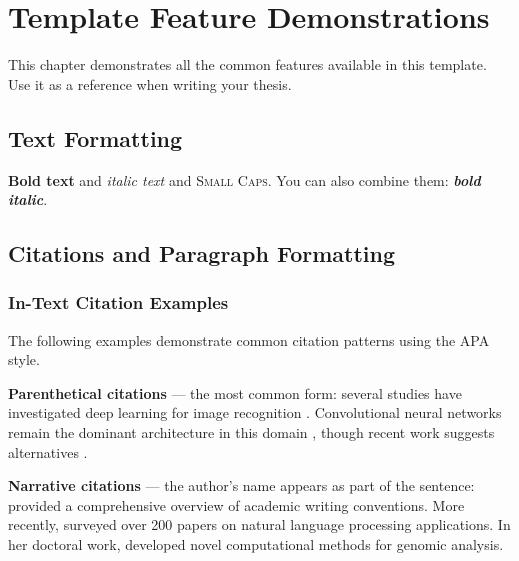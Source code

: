 
\chapter{Template Feature Demonstrations}
\label{chap:examples}

This chapter demonstrates all the common features available in this
template. Use it as a reference when writing your thesis.

\section{Text Formatting}
\label{sec:text}

\textbf{Bold text} and \textit{italic text} and \textsc{Small Caps}.
You can also combine them: \textbf{\textit{bold italic}}.

\section{Citations and Paragraph Formatting}
\label{sec:citations}

\subsection{In-Text Citation Examples}

The following examples demonstrate common citation patterns using the
APA style.

\textbf{Parenthetical citations} — the most common form:
several studies have investigated deep learning for image recognition
\parencite{chen2023survey}.  Convolutional neural networks remain the
dominant architecture in this domain \parencite{liu2024cnn}, though
recent work suggests alternatives \parencite{example2024}.

\textbf{Narrative citations} — the author's name appears as
part of the sentence: \textcite{examplebook2023} provided
a comprehensive overview of academic writing conventions.  More
recently, \textcite{chen2023survey} surveyed over 200 papers on
natural language processing applications.  In her doctoral work,
\textcite{kim2023dissertation} developed novel computational methods
for genomic analysis.


